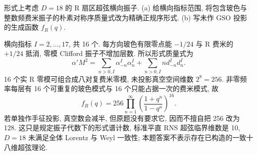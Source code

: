 \begin{exercise}
形式上考虑 $D=18$ 的 R 扇区超弦横向振子.
(a) 给横向指标范围, 将包含玻色与整数频费米振子的朴素对称序质量式改为精确正规序形式.
(b) 写未作 GSO 投影的生成函数 $f_R(q)$.
\end{exercise}
\begin{solution}
横向指标 $I=2,\ldots,17$, 共 16 个. 每方向玻色有限零点能 $-1/24$ 与 R 费米的 $+1/24$ 抵消, 零模 Clifford 振子不增加层数. 所以形式质量式为
\[
 \alpha'M^2=\sum_{n>0,I}\alpha_{-n}^I\alpha_n^I
 +\sum_{n>0,I}n d_{-n}^Id_n^I.
\]
16 个实 R 零模可组合成八对复费米零模, 未投影真空空间维数 $2^8=256$. 非零频率每层有 16 个可重复的玻色模式与 16 个只能占据一次的费米模式, 故
\[
 f_R(q)=256\prod_{n=1}^\infty
 \left(\frac{1+q^n}{1-q^n}\right)^{16}.
\]
若单独作手征投影, 真空数会减半, 但原题没有要求它, 因而不擅自把 256 改为 128. 这只是规定振子代数下的形式谱计数, 标准平直 RNS 超弦临界维数是 10, $D=18$ 未满足全体 Lorentz 与 Weyl 一致性; 本题答案不表示存在已构造的一致十八维超弦理论.
\end{solution}
